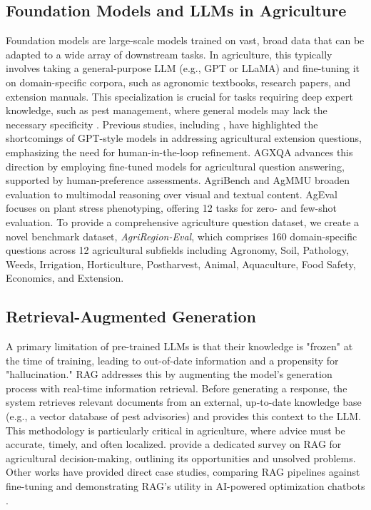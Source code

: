 \documentclass{ieeeaccess}
\begin{document}
\subsection{Foundation Models and LLMs in Agriculture}
Foundation models are large-scale models trained on vast, broad data that can be adapted to a wide array of downstream tasks. In agriculture, this typically involves taking a general-purpose LLM (e.g., GPT or LLaMA) and fine-tuning it on domain-specific corpora, such as agronomic textbooks, research papers, and extension manuals. This specialization is crucial for tasks requiring deep expert knowledge, such as pest management, where general models may lack the necessary specificity \cite{zhang2025ipm, yang2024gpt}.
%
Previous studies, including \cite{tzachor2023large}, have highlighted the shortcomings of GPT-style models in addressing agricultural extension questions, emphasizing the need for human-in-the-loop refinement. AGXQA \cite{kpodo2024agxqa} advances this direction by employing fine-tuned models for agricultural question answering, supported by human-preference assessments.  AgriBench \cite{zhou2024agribench} and AgMMU \cite{gauba2025agmmu} broaden evaluation to multimodal reasoning over visual and textual content. AgEval \cite{arshad2025leveraging} focuses on plant stress phenotyping, offering 12 tasks for zero- and few-shot evaluation.  To provide a comprehensive agriculture question dataset, we create a novel benchmark dataset, \textit{AgriRegion-Eval}, which comprises
160 domain-specific questions across 12 agricultural subfields including Agronomy, Soil, Pathology, Weeds, Irrigation, Horticulture, Postharvest, Animal, Aquaculture, Food Safety, Economics, and Extension.

\subsection{Retrieval-Augmented Generation}
A primary limitation of pre-trained LLMs is that their knowledge is "frozen" at the time of training, leading to out-of-date information and a propensity for "hallucination." RAG addresses this by augmenting the model's generation process with real-time information retrieval. Before generating a response, the system retrieves relevant documents from an external, up-to-date knowledge base (e.g., a vector database of pest advisories) and provides this context to the LLM.
This methodology is particularly critical in agriculture, where advice must be accurate, timely, and often localized. \cite{vizniuk2025comprehensive} provide a dedicated survey on RAG for agricultural decision-making, outlining its opportunities and unsolved problems. Other works have provided direct case studies, comparing RAG pipelines against fine-tuning and demonstrating RAG's utility in AI-powered optimization chatbots \cite{balaguer2024rag, balpande2024ai}.
\end{document}
